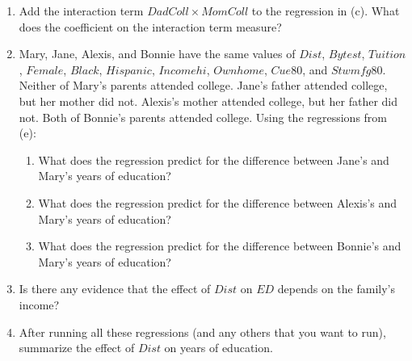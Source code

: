 \documentclass[11pt]{article}
\begin{document}
\begin{enumerate}
\begin{enumerate}
\item
  Add the interaction term \(DadColl \times MomColl\) to the regression in (c). What does the coefficient on the interaction term measure?

\item
  Mary, Jane, Alexis, and Bonnie have the same values of \(Dist\), \(Bytest\), \(Tuition\), \(Female\), \(Black\), \(Hispanic\), \(Incomehi\), \(Ownhome\), \(Cue80\), and \(Stwmfg80\). Neither of Mary's parents attended college. Jane's father attended college, but her mother did not. Alexis's mother attended college, but her father did not. Both of Bonnie's parents attended college. Using the regressions from (e):
  \begin{enumerate}
  \def\labelenumii{\roman{enumii}.}
  \item What does the regression predict for the difference between Jane's and Mary's years of education?
  \item What does the regression predict for the difference between Alexis's and Mary's years of education?
  \item What does the regression predict for the difference between Bonnie's and Mary's years of education?
  \end{enumerate}

\item
  Is there any evidence that the effect of \(Dist\) on \(ED\) depends on the family's income?

\item
  After running all these regressions (and any others that you want to run), summarize the effect of \(Dist\) on years of education.
\end{enumerate}
\end{enumerate}
\end{document}
